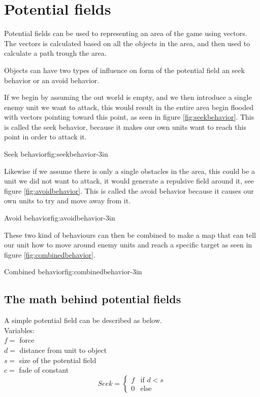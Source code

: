 \section{Potential fields}
	Potential fields can be used to representing an area of the game using vectors.  The vectors is calculated based on all the objects in the area, and then used to calculate a path trough the area.

	Objects can have two types of influence on form of the potential field an seek behavior or an avoid behavior.
	
	If we begin by assuming the out world is empty, and we then introduce a single enemy unit we want to attack, this would result in the entire area begin flooded with vectors pointing toward this point, as seen in figure \ref{fig:seekbehavior}. This is called the seek behavior, because it makes our own units want to reach this point in order to attack it.
	
		{Seek behavior\cite{pft}}{fig:seekbehavior}{-3in}
	
	Likewise if we assume there is only a single obstacles in the area, this could be a unit we did not want to attack, it would generate a repulsive field around it, see figure \ref{fig:avoidbehavior}. This is called the avoid behavior because it causes our own units to try and move away from it.

		{Avoid behavior\cite{pft}}{fig:avoidbehavior}{-3in}
		
	These two kind of behaviours can then be combined to make a map that can tell our unit how to move around enemy units and reach a specific target as seen in figure \ref{fig:combinedbehavior}.
	
		{Combined behavior\cite{pft}}{fig:combinedbehavior}{-3in}
		
	\subsection{The math behind potential fields}
		A simple potential field can be described as below.\\
		
		Variables:\\
		$f =$ force\\
		$d =$ distance from unit to object\\
		$s =$ size of the potential field\\
		$c =$ fade of constant\\
		\begin{displaymath}
			Seek = \begin{cases}
					f & \text{if $d < s$}\\
					0 & \text{else}
				\end{cases}		
		\end{displaymath}
			
